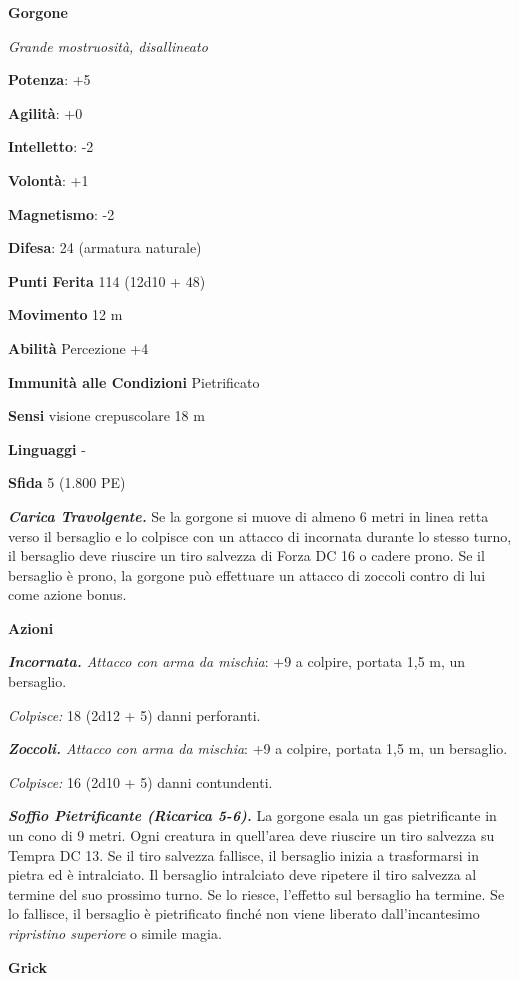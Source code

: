 \begin{multicols}{2}
\textbf{Gorgone}

\emph{Grande mostruosità, disallineato}

\textbf{Potenza}: +5

\textbf{Agilità}: +0

\textbf{Intelletto}: -2

\textbf{Volontà}: +1

\textbf{Magnetismo}: -2

\textbf{Difesa}: 24 (armatura naturale)

\textbf{Punti Ferita} 114 (12d10 + 48)

\textbf{Movimento} 12 m

\textbf{Abilità} Percezione +4

\textbf{Immunità alle Condizioni} Pietrificato

\textbf{Sensi} visione crepuscolare 18 m

\textbf{Linguaggi} -

\textbf{Sfida} 5 (1.800 PE)

\emph{\textbf{Carica Travolgente.}} Se la gorgone si muove di almeno 6
metri in linea retta verso il bersaglio e lo colpisce con un attacco di
incornata durante lo stesso turno, il bersaglio deve riuscire un tiro
salvezza di Forza DC 16 o cadere prono. Se il bersaglio è prono, la
gorgone può effettuare un attacco di zoccoli contro di lui come azione
bonus.

\textbf{Azioni}

\emph{\textbf{Incornata.} Attacco con arma da mischia}: +9 a colpire,
portata 1,5 m, un bersaglio.

\emph{Colpisce:} 18 (2d12 + 5) danni perforanti.

\emph{\textbf{Zoccoli.} Attacco con arma da mischia}: +9 a colpire,
portata 1,5 m, un bersaglio.

\emph{Colpisce:} 16 (2d10 + 5) danni contundenti.

\emph{\textbf{Soffio Pietrificante (Ricarica 5-6).}} La gorgone esala un
gas pietrificante in un cono di 9 metri. Ogni creatura in quell'area
deve riuscire un tiro salvezza su Tempra DC 13. Se il tiro
salvezza fallisce, il bersaglio inizia a trasformarsi in pietra ed è
intralciato. Il bersaglio intralciato deve ripetere il tiro salvezza al
termine del suo prossimo turno. Se lo riesce, l'effetto sul bersaglio ha
termine. Se lo fallisce, il bersaglio è pietrificato finché non viene
liberato dall'incantesimo \emph{ripristino superiore} o simile magia.

\textbf{Grick}


\end{multicols}
